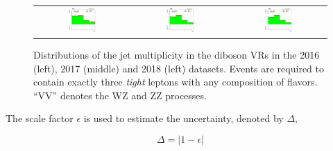 \begin{figure}[tbh!]
 \begin{center}
 \begin{tabular}{ccc}
 \includegraphics[width=0.325\textwidth]{figures/Part3/Systematics/njet_2016}&
  \includegraphics[width=0.325\textwidth]{figures/Part3/Systematics/njet_2017}&
 \includegraphics[width=0.325\textwidth]{figures/Part3/Systematics/njet_2018}\\
 \end{tabular}
 \caption{Distributions of the jet multiplicity in the diboson \acp{VR} in the 2016 (left), 2017 (middle) and 2018 (left) datasets. Events are required to contain exactly three \emph{tight} leptons with any composition of flavors. ``VV'' denotes the WZ and ZZ processes.}
 \label{fig:VV_CR}
 \end{center}
\end{figure}

The scale factor $\epsilon$ is used to estimate the uncertainty, denoted by $\Delta$,

\begin{equation}
\Delta=|1-\epsilon|
\end{equation}

